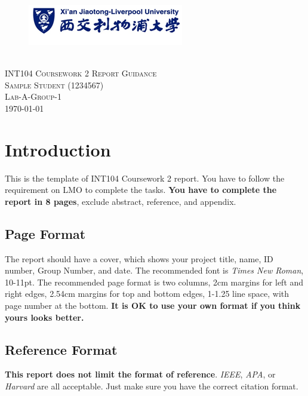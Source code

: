 \documentclass[10pt,twocolumn]{article}
\begin{document}
\begin{titlepage}
    \begin{center}
        \begin{figure}[h]
	        \centering
	        \includegraphics[scale=1]{XJTLU.png}
        \end{figure}
        \textsc{
        \\[2.5cm]
            \Huge{INT104 Coursework 2 Report Guidance}\\[2.5cm]
            \LARGE
            Sample Student (1234567)
        \\[1cm]
        Lab-A-Group-1
    \\[1cm]
    {\today}\\[.5cm]
}
    \end{center}
\end{titlepage}

\section{Introduction}
This is the template of INT104 Coursework 2 report. You have to follow the requirement on LMO to complete the tasks. \textbf{You have to complete the report in 8 pages}, exclude abstract, reference, and appendix. 

\subsection{Page Format}
The report should have a cover, which shows your project title, name, ID number, Group Number, and date. The recommended font is \textit{Times New Roman}, 10-11pt. The recommended page format is two columns, 2cm margins for left and right edges, 2.54cm margins for top and bottom edges, 1-1.25 line space, with page number at the bottom. \textbf{It is OK to use your own format if you think yours looks better.}

\subsection{Reference Format}
\textbf{This report does not limit the format of reference}. \textit{IEEE}, \textit{APA}, or \textit{Harvard} are all acceptable. Just make sure you have the correct citation format.
\end{document}
